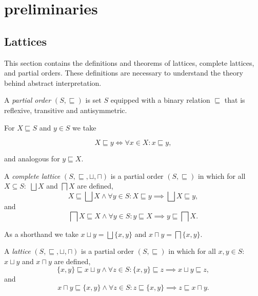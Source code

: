 
\section{preliminaries}\label{sec:preliminaries}

\subsection{Lattices}\label{subsec:lattices}
This section contains the definitions and theorems of lattices, complete lattices, and partial orders.
These definitions are necessary to understand the theory behind abstract interpretation.\cite{nielson_formal_2019}

\begin{definition}
    A \textit{partial order} $(S, \sqsubseteq)$ is set $S$ equipped with a binary relation $\sqsubseteq$ that is reflexive, transitive and antisymmetric.
\end{definition}


For $X \sqsubseteq S$ and $y \in S$ we take


\begin{equation*}
    X \sqsubseteq y \iff \forall x \in X : x \sqsubseteq y,
\end{equation*}


and analogous for $y \sqsubseteq X$.


\begin{definition}
    A \textit{complete lattice} $(S, \sqsubseteq, \sqcup, \sqcap)$ is a partial order $(S, \sqsubseteq)$ in which for all $X \subseteq S:$ $\bigsqcup X$ and $\bigsqcap X$ are defined,
        \begin{equation*}
            X \sqsubseteq \bigsqcup X \land \forall y \in S : X \sqsubseteq y \implies \bigsqcup X \sqsubseteq y,
        \end{equation*}
        and
        \begin{equation*}
            \bigsqcap X \sqsubseteq X \land \forall y \in S : y \sqsubseteq X \implies y \sqsubseteq \bigsqcap X.
        \end{equation*}
\end{definition}


As a shorthand we take $x \sqcup y = \bigsqcup \{x, y\}$ and $x \sqcap y = \bigsqcap \{x, y\}$.


\begin{definition}
    A \textit{lattice} $(S, \sqsubseteq, \sqcup, \sqcap)$ is a partial order $(S, \sqsubseteq)$ in which for all $x,y \in S:$ $x \sqcup y$ and $x \sqcap y$ are defined,
        \begin{equation*}
            \{x, y\} \sqsubseteq x \sqcup y \land \forall z \in S : \{x, y\} \sqsubseteq z \implies x \sqcup y \sqsubseteq z,
        \end{equation*}
        and
        \begin{equation*}
            x \sqcap y \sqsubseteq \{x, y\} \land \forall z \in S : z \sqsubseteq \{x, y\} \implies z \sqsubseteq x \sqcap y.
        \end{equation*}
\end{definition}


